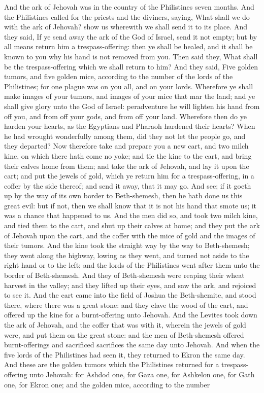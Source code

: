 And the ark of Jehovah was in the country of the Philistines seven months. And the Philistines called for the priests and the diviners, saying, What shall we do with the ark of Jehovah? show us wherewith we shall send it to its place. And they said, If ye send away the ark of the God of Israel, send it not empty; but by all means return him a trespass-offering: then ye shall be healed, and it shall be known to you why his hand is not removed from you. Then said they, What shall be the trespass-offering which we shall return to him? And they said, Five golden tumors, and five golden mice, according to the number of the lords of the Philistines; for one plague was on you all, and on your lords. Wherefore ye shall make images of your tumors, and images of your mice that mar the land; and ye shall give glory unto the God of Israel: peradventure he will lighten his hand from off you, and from off your gods, and from off your land. Wherefore then do ye harden your hearts, as the Egyptians and Pharaoh hardened their hearts? When he had wrought wonderfully among them, did they not let the people go, and they departed? Now therefore take and prepare you a new cart, and two milch kine, on which there hath come no yoke; and tie the kine to the cart, and bring their calves home from them; and take the ark of Jehovah, and lay it upon the cart; and put the jewels of gold, which ye return him for a trespass-offering, in a coffer by the side thereof; and send it away, that it may go. And see; if it goeth up by the way of its own border to Beth-shemesh, then he hath done us this great evil: but if not, then we shall know that it is not his hand that smote us; it was a chance that happened to us.  And the men did so, and took two milch kine, and tied them to the cart, and shut up their calves at home; and they put the ark of Jehovah upon the cart, and the coffer with the mice of gold and the images of their tumors. And the kine took the straight way by the way to Beth-shemesh; they went along the highway, lowing as they went, and turned not aside to the right hand or to the left; and the lords of the Philistines went after them unto the border of Beth-shemesh. And they of Beth-shemesh were reaping their wheat harvest in the valley; and they lifted up their eyes, and saw the ark, and rejoiced to see it. And the cart came into the field of Joshua the Beth-shemite, and stood there, where there was a great stone: and they clave the wood of the cart, and offered up the kine for a burnt-offering unto Jehovah. And the Levites took down the ark of Jehovah, and the coffer that was with it, wherein the jewels of gold were, and put them on the great stone: and the men of Beth-shemesh offered burnt-offerings and sacrificed sacrifices the same day unto Jehovah. And when the five lords of the Philistines had seen it, they returned to Ekron the same day.  And these are the golden tumors which the Philistines returned for a trespass-offering unto Jehovah: for Ashdod one, for Gaza one, for Ashkelon one, for Gath one, for Ekron one; and the golden mice, according to the number 